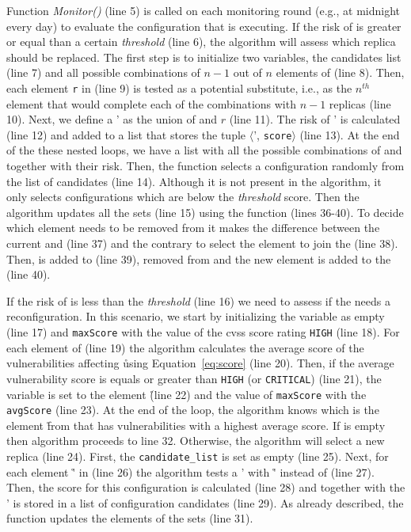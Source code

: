 Function \emph{Monitor()} (line 5) is called on each monitoring round (e.g., at midnight every day) to evaluate the configuration that is executing.
If the risk of \ES is greater or equal than a certain \emph{threshold} (line 6), the algorithm will assess which replica should be replaced.
The first step is to initialize two variables, the candidates list (line 7) and all possible combinations of $n-1$ out of $n$ elements of \ES (line 8).
Then, each element \texttt{r} in \RS (line 9) is tested as a potential substitute, i.e., as the $n^{th}$ element that would complete each of the combinations \COMB with $n-1$ replicas (line 10).
Next, we define a \ES' as the union of \COMB and $r$ (line 11).
The risk of \ES' is calculated (line 12) and added to a list that stores the tuple $\langle$\ES', \texttt{score}$\rangle$ (line 13). 
At the end of the these nested loops, we have a list with all the possible combinations of \ES and \RS together with their risk.
Then, the function \Rand selects a configuration randomly from the list of candidates (line 14). 
Although it is not present in the algorithm, it only selects configurations which are below the \emph{threshold} score. 
Then the algorithm updates all the sets (line 15) using the function \Replace (lines 36-40). 
To decide which element needs to be removed from \ES it makes the difference between the current \ES and \SC (line 37) and the contrary to select the element to join the \ES (line 38).
Then, \toRemove is added to \QS (line 39), removed from \ES and the new element is added to the \ES (line 40).
 

If the risk of \ES is less than the \emph{threshold} (line 16) we need to assess if the \ES needs a reconfiguration.
In this scenario, we start by initializing the variable \toRemove as empty (line 17) and \texttt{maxScore} with the value of the \gls{cvss} score rating \texttt{HIGH} (line 18).
For each element of \ES (line 19) the algorithm calculates the average score of the vulnerabilities affecting \r using Equation~\ref{eq:score} (line 20).
Then, if the average vulnerability score is equals or greater than \texttt{HIGH} (or \texttt{CRITICAL}) (line 21), the variable \toRemove is set to the element \r (line 22) and the value of \texttt{maxScore} with the \texttt{avgScore} (line 23).
At the end of the loop, the algorithm knows which is the element \r from \ES that has vulnerabilities with a highest average score.
If \toRemove is empty then algorithm proceeds to line 32. 
Otherwise, the algorithm will select a new replica (line 24).
First, the \texttt{candidate\_list} is set as empty (line 25).
Next, for each element \r' in \RS (line 26) the algorithm tests a \ES' with \r' instead of \toRemove (line 27).
Then, the score for this configuration is calculated (line 28) and together with the \ES' is stored in a list of configuration candidates (line 29).
As already described, the function \Replace updates the elements of the sets (line 31).

